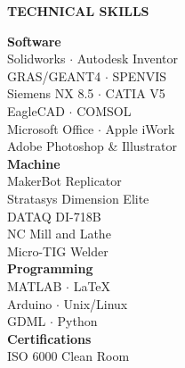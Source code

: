 \documentclass[10pt]{article}
\begin{document}
\begin{minipage}[t]{0.30\textwidth}
{\color{gray}
{\Large \uppercase{\textbf{Technical Skills}}} \hspace{.1cm} \sout{\hfill} \\[-.2cm]    
}

{\large \sc \textbf{Software}}\\
{\sc Solidworks} {\Large $\cdot$} Autodesk Inventor \\ 
GRAS/GEANT4 {\Large $\cdot$} SPENVIS \\
Siemens NX 8.5 {\Large $\cdot$} CATIA V5 \\
EagleCAD {\Large $\cdot$} COMSOL \\
Microsoft Office {\Large $\cdot$} Apple iWork\\
Adobe Photoshop \& Illustrator  \\

{\large \sc \textbf{Machine}}\\
MakerBot Replicator \\ 
Stratasys Dimension Elite \\
DATAQ DI-718B \\
NC Mill and Lathe \\ %
Micro-TIG Welder \\

{\large \sc \textbf{Programming}}\\
MATLAB {\Large $\cdot$} \LaTeX \\
Arduino {\Large $\cdot$} Unix/Linux   \\ 
GDML {\Large $\cdot$} Python\\

{\large \sc \textbf{Certifications}}\\
ISO 6000 Clean Room\\

\end{minipage}
\hspace{.005\textwidth}\hfill\vline\hspace{.015\textwidth}
\hfill
\end{document}
